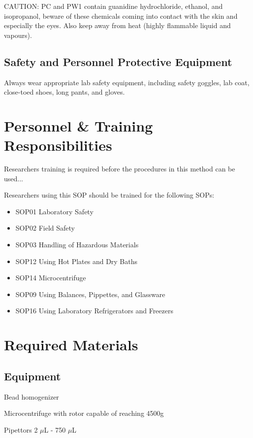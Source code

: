 \documentclass[12pt]{../SOP3_beta}\usepackage[]{graphicx}\usepackage[]{xcolor}
\begin{document}
\NP CAUTION: PC and PW1 contain guanidine hydrochloride, ethanol, and isopropanol, beware of these chemicals coming into contact with the skin and especially the eyes. Also keep away from heat (highly flammable liquid and vapours).

\subsection{Safety and Personnel Protective Equipment}

\NP Always wear appropriate lab safety equipment, including safety goggles, lab coat, close-toed shoes, long pants, and gloves. 

\section{Personnel \& Training Responsibilities}

\NP Researchers training is required before the procedures in this method can be used... 

\NP Researchers using this SOP should be trained for the following SOPs:

\begin{itemize}
  \item SOP01 Laboratory Safety
  \item SOP02 Field Safety
  \item SOP03 Handling of Hazardous Materials
  \item SOP12 Using Hot Plates and Dry Baths
  \item SOP14 Microcentrifuge
  \item SOP09 Using Balances, Pippettes, and Glassware
  \item SOP16 Using Laboratory Refrigerators and Freezers
\end{itemize}


\section{Required Materials}

\subsection{Equipment}

\NP Bead homogenizer

\NP Microcentrifuge with rotor capable of reaching 4500g

\NP Pipettors 2 $\mu$L - 750 $\mu$L
\end{document}
